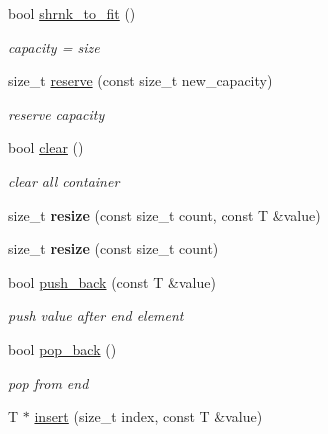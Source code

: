 \begin{DoxyCompactItemize}
\mbox{\label{classDyn__array_a021f3baee09ae4cc91a450d5f60cb318}} 
bool \hyperlink{classDyn__array_a021f3baee09ae4cc91a450d5f60cb318}{shrnk\+\_\+to\+\_\+fit} ()
\begin{DoxyCompactList}\small\item\em capacity = size \end{DoxyCompactList}\item 
size\+\_\+t \hyperlink{classDyn__array_a8cc1e876bc20ce13490898be4bdd7882}{reserve} (const size\+\_\+t new\+\_\+capacity)
\begin{DoxyCompactList}\small\item\em reserve capacity \end{DoxyCompactList}\item 
\mbox{\label{classDyn__array_aa7dee5a6c9f658532f9175b45d3f24e5}} 
bool \hyperlink{classDyn__array_aa7dee5a6c9f658532f9175b45d3f24e5}{clear} ()
\begin{DoxyCompactList}\small\item\em clear all container \end{DoxyCompactList}\item 
\mbox{\label{classDyn__array_a2412c58d9a14876406e4f0ca10722020}} 
size\+\_\+t {\bfseries resize} (const size\+\_\+t count, const T \&value)
\item 
\mbox{\label{classDyn__array_a3eefab6e61af85f898727d5a44ecf0ec}} 
size\+\_\+t {\bfseries resize} (const size\+\_\+t count)
\item 
bool \hyperlink{classDyn__array_a24797d477a7655bf37d1b1dd97eac1e3}{push\+\_\+back} (const T \&value)
\begin{DoxyCompactList}\small\item\em push value after end element \end{DoxyCompactList}\item 
\mbox{\label{classDyn__array_ac28c19e9c075fe6a72cf9fcaeed70d90}} 
bool \hyperlink{classDyn__array_ac28c19e9c075fe6a72cf9fcaeed70d90}{pop\+\_\+back} ()
\begin{DoxyCompactList}\small\item\em pop from end \end{DoxyCompactList}\item 
T $\ast$ \hyperlink{classDyn__array_a4b261db6ebc4b4b13136e262c955c71a}{insert} (size\+\_\+t index, const T \&value)

\end{DoxyCompactItemize}

